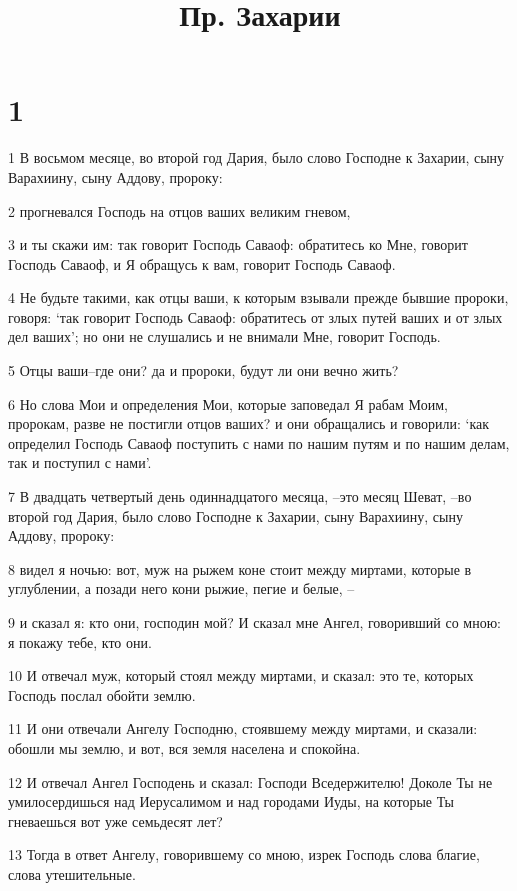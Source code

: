 

\title{Пр. Захарии}


\chapter{1}

\par 1 В восьмом месяце, во второй год Дария, было слово Господне к Захарии, сыну Варахиину, сыну Аддову, пророку:
\par 2 прогневался Господь на отцов ваших великим гневом,
\par 3 и ты скажи им: так говорит Господь Саваоф: обратитесь ко Мне, говорит Господь Саваоф, и Я обращусь к вам, говорит Господь Саваоф.
\par 4 Не будьте такими, как отцы ваши, к которым взывали прежде бывшие пророки, говоря: `так говорит Господь Саваоф: обратитесь от злых путей ваших и от злых дел ваших'; но они не слушались и не внимали Мне, говорит Господь.
\par 5 Отцы ваши--где они? да и пророки, будут ли они вечно жить?
\par 6 Но слова Мои и определения Мои, которые заповедал Я рабам Моим, пророкам, разве не постигли отцов ваших? и они обращались и говорили: `как определил Господь Саваоф поступить с нами по нашим путям и по нашим делам, так и поступил с нами'.
\par 7 В двадцать четвертый день одиннадцатого месяца, --это месяц Шеват, --во второй год Дария, было слово Господне к Захарии, сыну Варахиину, сыну Аддову, пророку:
\par 8 видел я ночью: вот, муж на рыжем коне стоит между миртами, которые в углублении, а позади него кони рыжие, пегие и белые, --
\par 9 и сказал я: кто они, господин мой? И сказал мне Ангел, говоривший со мною: я покажу тебе, кто они.
\par 10 И отвечал муж, который стоял между миртами, и сказал: это те, которых Господь послал обойти землю.
\par 11 И они отвечали Ангелу Господню, стоявшему между миртами, и сказали: обошли мы землю, и вот, вся земля населена и спокойна.
\par 12 И отвечал Ангел Господень и сказал: Господи Вседержителю! Доколе Ты не умилосердишься над Иерусалимом и над городами Иуды, на которые Ты гневаешься вот уже семьдесят лет?
\par 13 Тогда в ответ Ангелу, говорившему со мною, изрек Господь слова благие, слова утешительные.
